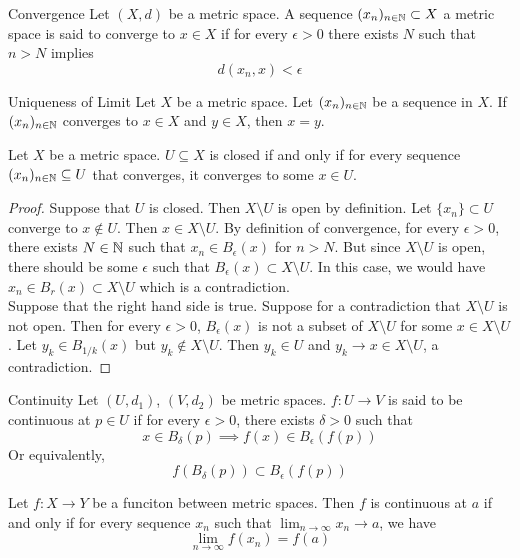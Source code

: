 \documentclass[a4paper]{article}
\begin{document}
\begin{defn}{Convergence}{} Let $(X,d)$ be a metric space. A sequence $(x_n)_{n\in\mathbb{N}}\subset X$ a metric space is said to converge to $x\in X$ if for every $\epsilon>0$ there exists $N$ such that $n>N$ implies $$d(x_n,x)<\epsilon$$
\end{defn}

\begin{lmm}{Uniqueness of Limit}{} Let $X$ be a metric space. Let $(x_n)_{n\in\mathbb{N}}$ be a sequence in $X$. If $(x_n)_{n\in\mathbb{N}}$ converges to $x\in X$ and $y\in X$, then $x=y$. 
\end{lmm}

\begin{prp}{}{} Let $X$ be a metric space. $U\subseteq X$ is closed if and only if for every sequence $(x_n)_{n\in\mathbb{N}}\subseteq U$ that converges, it converges to some $x\in U$. 
\begin{proof} Suppose that $U$ is closed. Then $X\setminus U$ is open by definition. Let $\{x_n\}\subset U$ converge to $x\notin U$. Then $x\in X\setminus U$. By definition of convergence, for every $\epsilon>0$, there exists $N\in\mathbb{N}$ such that $x_n\in B_\epsilon(x)$ for $n>N$. But since $X\setminus U$ is open, there should be some $\epsilon$ such that $B_\epsilon(x)\subset X\setminus U$. In this case, we would have $x_n\in B_r(x)\subset X\setminus U$ which is a contradiction. \\
Suppose that the right hand side is true. Suppose for a contradiction that $X\setminus U$ is not open. Then for every $\epsilon>0$, $B_\epsilon(x)$ is not a subset of $X\setminus U$ for some $x\in X\setminus U$. Let $y_k\in B_{1/k}(x)$ but $y_k\notin X\setminus U$. Then $y_k\in U$ and $y_k\to x\in X\setminus U$, a contradiction. 
\end{proof}
\end{prp}

\begin{defn}{Continuity}{} Let $(U,d_1)$, $(V,d_2)$ be metric spaces. $f:U\to V$ is said to be continuous at $p\in U$ if for every $\epsilon>0$, there exists $\delta>0$ such that $$x\in B_{\delta}(p)\implies f(x)\in B_{\epsilon}(f(p))$$ Or equivalently, $$f(B_{\delta}(p))\subset B_{\epsilon}(f(p))$$
\end{defn}

\begin{prp}{}{} Let $f:X\to Y$ be a funciton between metric spaces. Then $f$ is continuous at $a$ if and only if for every sequence $x_n$ such that $\lim_{n\to\infty}x_n\to a$, we have $$\lim_{n\to\infty}f(x_n)=f(a)$$
\end{prp}
\end{document}
